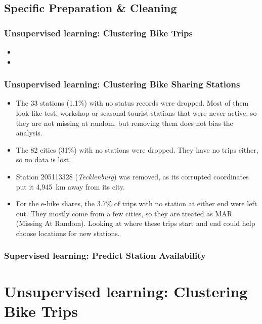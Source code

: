 \documentclass[11pt,a4paper,english]{article}
\begin{document}
\subsection{Specific Preparation \& Cleaning}
\subsubsection{Unsupervised learning: Clustering Bike Trips}
\begin{itemize}
    \item
    \item
\end{itemize}

\subsubsection{Unsupervised learning: Clustering Bike Sharing Stations}

\begin{itemize}
    \item The 33 stations (1.1\%) with no status records were dropped. Most of them look like test, workshop or seasonal tourist stations that were never active, so they are not missing at random, but removing them does not bias the analysis.
    \item The 82 cities (31\%) with no stations were dropped. They have no trips either, so no data is lost.
    \item Station 205113328 (\textit{Tecklenburg}) was removed, as its corrupted coordinates put it 4,945~km away from its city.
    \item For the e-bike shares, the 3.7\% of trips with no station at either end were left out. They mostly come from a few cities, so they are treated as MAR (Missing At Random). Looking at where these trips start and end could help choose locations for new stations.
\end{itemize}

\subsubsection{Supervised learning: Predict Station Availability}

\newpage


\section{Unsupervised learning: Clustering Bike Trips}
\end{document}
